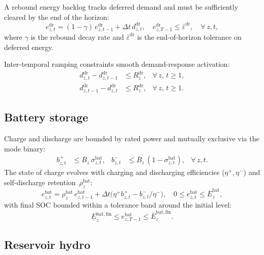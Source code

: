 \documentclass{article}
\begin{document}
A rebound energy backlog tracks deferred demand and must be sufficiently cleared by the end
of the horizon:
\begin{equation}
e^{\mathrm{dr}}_{z,t}
= (1 - \gamma)\, e^{\mathrm{dr}}_{z,t-1}
+ \Delta t \, d^{\mathrm{dr}}_{z,t}, \quad
e^{\mathrm{dr}}_{z,T-1} \leq \bar{\varepsilon}^{\mathrm{dr}},
\quad \forall\, z,t,
\label{eq:dr_rebound}
\end{equation}
where $\gamma$ is the rebound decay rate and $\bar{\varepsilon}^{\mathrm{dr}}$ is the
end-of-horizon tolerance on deferred energy.

Inter-temporal ramping constraints smooth demand-response activation:
\begin{align}
d^{\mathrm{dr}}_{z,t} - d^{\mathrm{dr}}_{z,t-1}
&\leq R^{\mathrm{dr}}_z,
& \forall\, z,\, t \geq 1, \label{eq:dr_ramp_up} \\
d^{\mathrm{dr}}_{z,t-1} - d^{\mathrm{dr}}_{z,t}
&\leq R^{\mathrm{dr}}_z,
& \forall\, z,\, t \geq 1. \label{eq:dr_ramp_down}
\end{align}

\subsection{Battery storage}

Charge and discharge are bounded by rated power and mutually exclusive via the mode binary:
\begin{align}
b^{+}_{z,t} &\leq \overline{B}_z \, \sigma^{\mathrm{bat}}_{z,t}, &
b^{-}_{z,t} &\leq \overline{B}_z \, (1 - \sigma^{\mathrm{bat}}_{z,t}), & \forall\, z,t.
\label{eq:battery_mode}
\end{align}
The state of charge evolves with charging and discharging efficiencies ($\eta^{+}, \eta^{-}$) and self-discharge retention~$\rho^{\mathrm{bat}}_z$:
\begin{equation}
e^{\mathrm{bat}}_{z,t} = \rho^{\mathrm{bat}}_z \, e^{\mathrm{bat}}_{z,t-1} + \Delta t \bigl( \eta^{+} b^{+}_{z,t} - b^{-}_{z,t} / \eta^{-} \bigr), \quad
0 \leq e^{\mathrm{bat}}_{z,t} \leq \overline{E}^{\mathrm{bat}}_z,
\label{eq:battery_soc}
\end{equation}
with final SOC bounded within a tolerance band around the initial level:
\begin{equation}
\underline{E}^{\mathrm{bat,fin}}_z \leq e^{\mathrm{bat}}_{z,T-1} \leq \overline{E}^{\mathrm{bat,fin}}_z.
\label{eq:battery_final}
\end{equation}

\subsection{Reservoir hydro}
\end{document}
